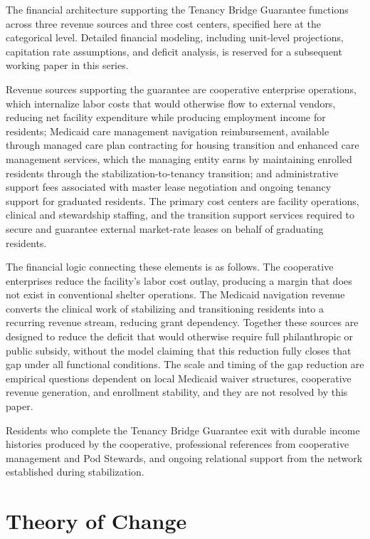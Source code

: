 \documentclass[12pt, letterpaper]{article}
\begin{document}
The financial architecture supporting the Tenancy Bridge Guarantee functions across three revenue sources and three cost centers, specified here at the categorical level. Detailed financial modeling, including unit-level projections, capitation rate assumptions, and deficit analysis, is reserved for a subsequent working paper in this series.

Revenue sources supporting the guarantee are cooperative enterprise operations, which internalize labor costs that would otherwise flow to external vendors, reducing net facility expenditure while producing employment income for residents; Medicaid care management navigation reimbursement, available through managed care plan contracting for housing transition and enhanced care management services, which the managing entity earns by maintaining enrolled residents through the stabilization-to-tenancy transition; and administrative support fees associated with master lease negotiation and ongoing tenancy support for graduated residents. The primary cost centers are facility operations, clinical and stewardship staffing, and the transition support services required to secure and guarantee external market-rate leases on behalf of graduating residents.

The financial logic connecting these elements is as follows. The cooperative enterprises reduce the facility's labor cost outlay, producing a margin that does not exist in conventional shelter operations. The Medicaid navigation revenue converts the clinical work of stabilizing and transitioning residents into a recurring revenue stream, reducing grant dependency. Together these sources are designed to reduce the deficit that would otherwise require full philanthropic or public subsidy, without the model claiming that this reduction fully closes that gap under all functional conditions. The scale and timing of the gap reduction are empirical questions dependent on local Medicaid waiver structures, cooperative revenue generation, and enrollment stability, and they are not resolved by this paper.

Residents who complete the Tenancy Bridge Guarantee exit with durable income histories produced by the cooperative, professional references from cooperative management and Pod Stewards, and ongoing relational support from the network established during stabilization.

\section{Theory of Change}
\end{document}
